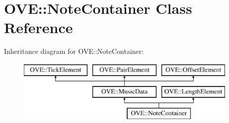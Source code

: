 \hypertarget{class_o_v_e_1_1_note_container}{}\section{O\+VE\+:\+:Note\+Container Class Reference}
\label{class_o_v_e_1_1_note_container}
Inheritance diagram for O\+VE\+:\+:Note\+Container\+:\begin{figure}[H]
\begin{center}
\leavevmode
\includegraphics[height=3.000000cm]{class_o_v_e_1_1_note_container}
\end{center}
\end{figure}
